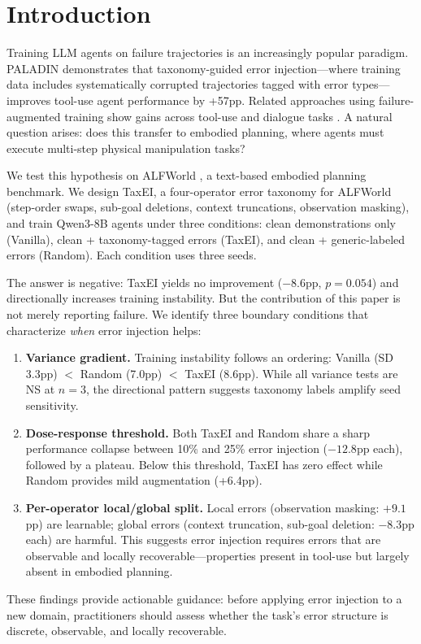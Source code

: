 \section{Introduction}
\label{sec:introduction}

Training LLM agents on failure trajectories is an increasingly popular paradigm. PALADIN \cite{paladin2025} demonstrates that taxonomy-guided error injection---where training data includes systematically corrupted trajectories tagged with error types---improves tool-use agent performance by +57pp. Related approaches using failure-augmented training show gains across tool-use \cite{song2024eto,eef2025,wang2024learning_from_failure} and dialogue tasks \cite{agentHER2025}. A natural question arises: does this transfer to embodied planning, where agents must execute multi-step physical manipulation tasks?

We test this hypothesis on ALFWorld \cite{shridhar2021alfworld}, a text-based embodied planning benchmark. We design TaxEI, a four-operator error taxonomy for ALFWorld (step-order swaps, sub-goal deletions, context truncations, observation masking), and train Qwen3-8B agents under three conditions: clean demonstrations only (Vanilla), clean + taxonomy-tagged errors (TaxEI), and clean + generic-labeled errors (Random). Each condition uses three seeds.

The answer is negative: TaxEI yields no improvement ($-8.6$pp, $p{=}0.054$) and directionally increases training instability. But the contribution of this paper is not merely reporting failure. We identify three boundary conditions that characterize \emph{when} error injection helps:

\begin{enumerate}[nosep,leftmargin=*]
\item \textbf{Variance gradient.} Training instability follows an ordering: Vanilla (SD 3.3pp) $<$ Random (7.0pp) $<$ TaxEI (8.6pp). While all variance tests are NS at $n{=}3$, the directional pattern suggests taxonomy labels amplify seed sensitivity.

\item \textbf{Dose-response threshold.} Both TaxEI and Random share a sharp performance collapse between 10\% and 25\% error injection ($-12.8$pp each), followed by a plateau. Below this threshold, TaxEI has zero effect while Random provides mild augmentation (+6.4pp).

\item \textbf{Per-operator local/global split.} Local errors (observation masking: $+9.1$pp) are learnable; global errors (context truncation, sub-goal deletion: $-8.3$pp each) are harmful. This suggests error injection requires errors that are observable and locally recoverable---properties present in tool-use but largely absent in embodied planning.
\end{enumerate}

These findings provide actionable guidance: before applying error injection to a new domain, practitioners should assess whether the task's error structure is discrete, observable, and locally recoverable.
